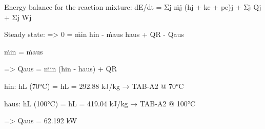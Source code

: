 Energy balance for the reaction mixture:  
dE/dt = Σj ṁj (hj + ke + pe)j + Σj Qj + Σj Wj  

Steady state:  
=> 0 = ṁin hin - ṁaus haus + QR - Qaus  

ṁin = ṁaus  

=> Qaus = ṁin (hin - haus) + QR  

hin:  
hL (70°C) = hL = 292.88 kJ/kg → TAB-A2 @ 70°C  

haus:  
hL (100°C) = hL = 419.04 kJ/kg → TAB-A2 @ 100°C  

=> Qaus = 62.192 kW